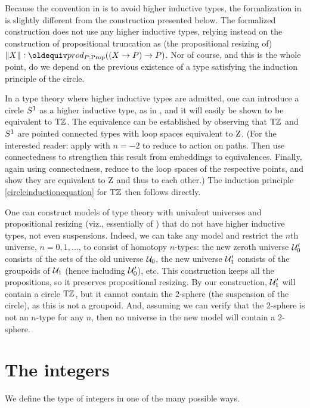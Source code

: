 \documentclass[a4paper,12pt]{amsart}
\begin{document}
Because the convention in {\UniMath} is to avoid higher inductive types,
the formalization in \cite{circleind-Dan} is
slightly different from the construction presented below.
The formalized construction does not use any higher inductive types,
relying instead on the construction of propositional truncation as
(the propositional resizing of)
$\Trunc X \defeq prod_{P:\Prop}((X \to P) \to P)$.
Nor of course, and this is the whole point, do we
depend on the previous existence of a type satisfying the induction principle of the circle. 

In a type theory where higher inductive types are admitted,
one can introduce a circle ${S^1}$ as a higher inductive type, 
as in \cite[Ch. 6.1]{hottbook}, and it will easily be shown to be equivalent to ${\mathrm{T}\mathbb{Z}}$.
The equivalence can be established by observing that ${\mathrm{T}\mathbb{Z}}$ and ${S^1}$ 
are pointed connected types with loop spaces equivalent to $\mathrm{Z}$.
(For the interested reader: apply \cite[Lemma 7.6.2]{hottbook} with $n=-2$
to reduce to action on paths. Then use connectedness to strengthen
this result from embeddings to equivalences. 
Finally, again using connectedness, reduce to the loop spaces
of the respective points, and show they are equivalent to $\mathrm{Z}$ and thus to each other.)
The induction principle \cref{circleinductionequation} for ${\mathrm{T}\mathbb{Z}}$ then follows directly.

One can construct models of type theory with univalent universes and propositional resizing
(viz., essentially of \UniMath{})
that do not have higher inductive types, not even suspensions.
Indeed, we can take any model and restrict the $n$th universe, $n=0,1,\dots$,
to consist of homotopy $n$-types:
the new zeroth universe $\mathcal{U}'_0$ consists of the sets of the old universe $\mathcal{U}_0$,
the new universe $\mathcal{U}'_1$ consists of the groupoids of $\mathcal{U}_1$ (hence including $\mathcal{U}'_0$),
etc.
This construction keeps all the propositions, so it preserves propositional resizing.
By our construction, $\mathcal{U}'_1$ will contain a circle ${\mathrm{T}\mathbb{Z}}$,
but it cannot contain the $2$-sphere (the suspension of the circle),
as this is not a groupoid.
And, assuming we can verify that the $2$-sphere is not an $n$-type for any $n$,
then no universe in the new model will contain a $2$-sphere.

\section{The integers}
\label{sec:integers}

We define the type of integers in one of the many possible ways.
\end{document}

